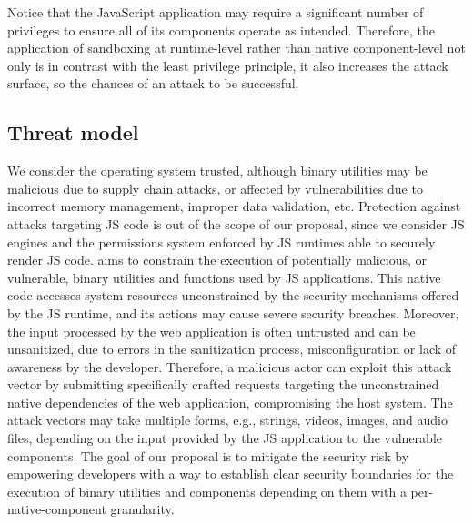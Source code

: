  \vspace{2 mm}
  \noindent Notice that the JavaScript application may require a
  significant number of privileges to ensure all of its components
  operate as intended. Therefore, the application of sandboxing at
  runtime-level rather than native component-level not only is in
  contrast with the least privilege principle, it also increases the
  attack surface, so the chances of an attack to be successful.  

\subsection{Threat model}
\label{sect:threat-model}

We consider the operating system trusted, although binary utilities
may be malicious due to supply chain attacks, or affected by
vulnerabilities due to incorrect memory management, improper data
validation, etc. Protection against attacks targeting JS code is out
of the scope of our proposal, since we consider JS engines and the
permissions system enforced by JS runtimes able to securely render JS
code. \natisand aims to constrain the execution of potentially malicious, or vulnerable,
binary utilities and functions used by JS applications.  This native
code accesses system resources unconstrained by the security
mechanisms offered by the JS runtime, and its actions may
cause severe security breaches. Moreover, the input processed by the
web application is often untrusted and can be unsanitized, due to
errors in the sanitization process, misconfiguration or lack of
awareness by the developer.  Therefore, a malicious actor can exploit
this attack vector by submitting specifically crafted requests
targeting the unconstrained native dependencies of the web
application, compromising the host system. The attack vectors may take
multiple forms, e.g., strings, videos, images, and audio files,
depending on the input provided by the JS application to the
vulnerable components. The goal of our proposal is to mitigate the
security risk by
empowering developers with a way to establish clear security
boundaries for the execution of binary utilities and components
depending on them with a per-native-component granularity.

